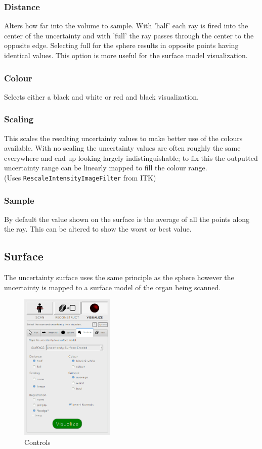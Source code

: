 \subsubsection{Distance}
Alters how far into the volume to sample. With 'half' each ray is fired into the center of the uncertainty and with 'full' the ray passes through the center to the opposite edge. Selecting full for the sphere results in opposite points having identical values. This option is more useful for the surface model visualization.

\subsubsection{Colour}
Selects either a black and white or red and black visualization.

\subsubsection{Scaling}
This scales the resulting uncertainty values to make better use of the colours available. With no scaling the uncertainty values are often roughly the same everywhere and end up looking largely indistinguishable; to fix this the outputted uncertainty range can be linearly mapped to fill the colour range.\\(Uses \texttt{RescaleIntensityImageFilter} from ITK)

\subsubsection{Sample}
By default the value shown on the surface is the average of all the points along the ray. This can be altered to show the worst or best value.

\clearpage
\subsection{Surface}\label{implementation:surface}
The uncertainty surface uses the same principle as the sphere however the uncertainty is mapped to a surface model of the organ being scanned.

\begin{figure}
  \vspace{-20pt}
  \includegraphics[width=0.4\textwidth]{images/tool/4_surface.png}
  \caption{Controls}\label{fig:surface_settings}
\end{figure}

